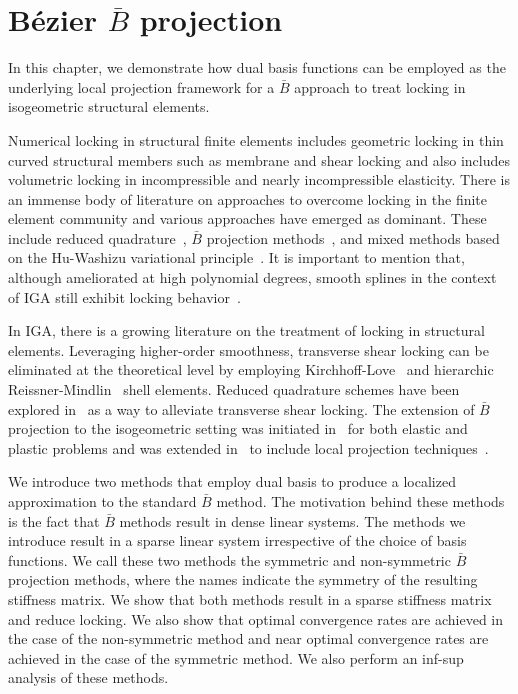 \chapter{B\'{e}zier $\bar{B}$ projection}
\label{chp:chapter6}
\graphicspath{{figures/}{figures/chapter6/}}

In this chapter, we demonstrate how dual basis functions can be employed as the underlying local projection framework for a $\bar{B}$ approach to treat locking in isogeometric structural elements.

Numerical locking in structural finite elements includes geometric locking in thin curved structural members such as membrane and shear locking and also includes volumetric locking in incompressible and nearly incompressible elasticity. There is an immense body of literature on approaches to overcome locking in the finite element community and various approaches have emerged as dominant. These include reduced quadrature~\cite{malkus_mixed_1978,zienkiewicz_reduced_1971}, $\bar{B}$ projection methods~\cite{nagtegaal_numerically_1974,hughes_generalization_1980, NME:NME4328}, and mixed methods based on the Hu-Washizu variational principle~\cite{dolbow_volumetric_1999,kasper_mixed-enhanced_2000,hughes_variational_1986, NME:NME3048}. It is important to mention that, although ameliorated at high polynomial degrees, smooth splines in the context of IGA still exhibit locking behavior~\cite{echter_numerical_2010, bouclier_locking_2012}.

In IGA, there is a growing literature on the treatment of locking in structural elements. Leveraging higher-order smoothness, transverse shear locking can be eliminated at the theoretical level by employing Kirchhoff-Love~\cite{kiendl2009isogeometric, kiendl2015isogeometric} and hierarchic Reissner-Mindlin~\cite{oesterle_hierarchic_2017, oesterle_shear_2016,echter_hierarchic_2013} shell elements. Reduced quadrature schemes have been explored in~\cite{adam_improved_2014, adam_improved_2015, adam_selective_2015} as a way to alleviate transverse shear locking. The extension of $\bar{B}$ projection to the isogeometric setting was initiated in~\cite{elguedj:hal-00457010} for both elastic and plastic problems and was extended in~\cite{bouclier_efficient_2013} to include local projection techniques~\cite{mitchell_method_2011,govindjee_convergence_2012}.

We introduce two methods that employ \Bezier dual basis to produce a localized approximation to the standard $\bar{B}$ method. The motivation behind these methods is the fact that $\bar{B}$ methods result in dense linear systems. The methods we introduce result in a sparse linear system irrespective of the choice of basis functions. We call these two methods the symmetric and non-symmetric \Bezier $\bar{B}$ projection methods, where the names indicate the symmetry of the resulting stiffness matrix. We show that both methods result in a sparse stiffness matrix and reduce locking. We also show that optimal convergence rates are achieved in the case of the non-symmetric method and near optimal convergence rates are achieved in the case of the symmetric method.  We also perform an inf-sup analysis of these methods.

